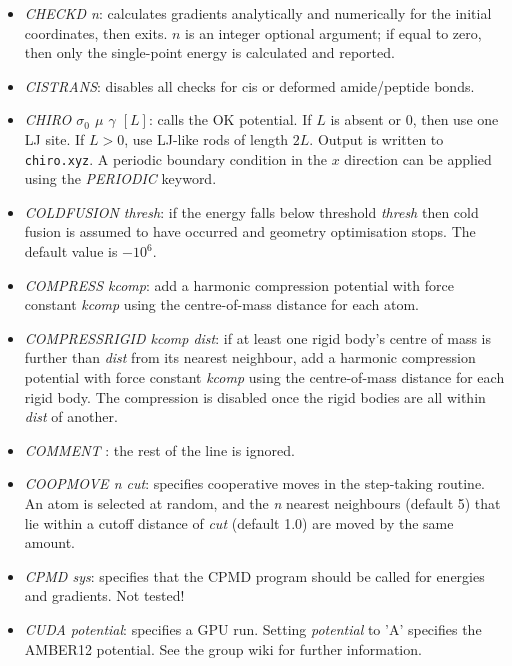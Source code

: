 \documentclass[12pt,a4paper,dvips]{article}
\begin{document}
\begin{itemize}
\item {\it CHECKD n\/}: calculates gradients analytically and numerically for the initial coordinates, then exits. $n$ is an 
integer optional argument; if equal to zero, then only the single-point energy is calculated and reported.

\item {\it CISTRANS\/}: disables all checks for cis or deformed amide/peptide bonds.

\item {\it CHIRO $\sigma_0$ $\mu$ $\gamma$ $[L]$}: calls the OK potential. If $L$ is absent or $0$, then use one LJ site. If $L > 0$, use LJ-like rods of length $2L$. Output is written to {\tt chiro.xyz}. A periodic boundary condition in the $x$ direction can be applied using the {\it PERIODIC} keyword.

\item {\it COLDFUSION thresh\/}: if the energy falls below threshold {\it thresh} then
cold fusion is assumed to have occurred and geometry optimisation stops.
The default value is $-10^6$.

\item {\it COMPRESS kcomp\/}: add a harmonic compression potential with force constant {\it kcomp\/} using the
centre-of-mass distance for each atom.

\item {\it COMPRESSRIGID kcomp\/ dist}: if at least one rigid body's centre of mass is further than {\it dist} from its nearest neighbour,  
add a harmonic compression potential with force constant {\it kcomp\/} using the centre-of-mass distance for each rigid body. The compression is 
disabled once the rigid bodies are all within {\it dist} of another. 

\item {\it COMMENT \/}: the rest of the line is ignored.

\item {\it COOPMOVE n cut\/}: specifies cooperative moves in the step-taking routine. An atom is
selected at random, and the {\it n} nearest neighbours (default 5) that lie within a cutoff
distance of {\it cut} (default 1.0) are moved by the same amount.

\item {\it CPMD sys\/}: specifies that the CPMD program should be called for energies and gradients. Not
tested!

\item {\it CUDA potential\/}: specifies a GPU run. Setting {\it potential} to 'A' specifies the AMBER12 potential. See the group wiki for further information. 


\end{itemize}
\end{document}
